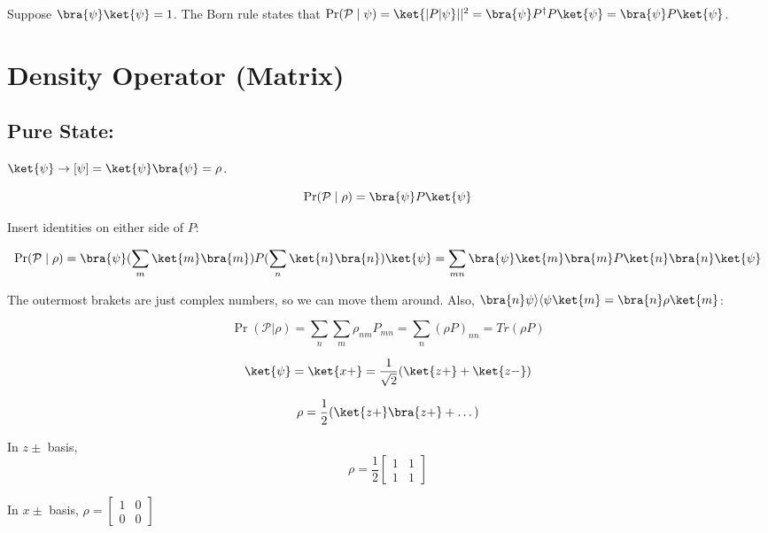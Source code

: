 \documentclass[a4paper,twoside,master.tex]{subfiles}
\begin{document}
Suppose $\bra{\psi}\ket{\psi} = 1$. The Born rule states that
$\Pr(\mathcal{P}\mid\psi) = \ket{|P|\psi}||^2 = \bra{\psi}P^\dagger P\ket{\psi} = \bra{\psi}P\ket{\psi}$.

\section{Density Operator (Matrix)}
\label{sec:density_operator_(matrix)}


\subsection{Pure State:}
\label{sub:pure_state:}

$\ket{\psi}\rightarrow [\psi]=\ket{\psi}\bra{\psi} = \rho$.

\begin{equation}
\Pr(\mathcal{P}\mid\rho) = \bra{\psi}P\ket{\psi}
\end{equation}

Insert identities on either side of $P$:

\begin{equation}
\Pr(\mathcal{P}\mid\rho) = \bra{\psi}(\sum_m\ket{m}\bra{m})P(\sum_n\ket{n}\bra{n})\ket{\psi} = \sum_{mn}\bra{\psi}\ket{m}\bra{m}P\ket{n}\bra{n}\ket{\psi}
\end{equation}

The outermost brakets are just complex numbers, so we can move them
around. Also,
$\bra{ n}\psi\rangle\langle\psi\ket{m} = \bra{ n}\rho\ket{m}$:

\begin{equation}
\Pr(\mathcal{P}|\rho) =\sum_n\sum_m\rho_{nm}P_{mn} = \sum_n(\rho P)_{nn} = Tr(\rho P)
\end{equation}

\begin{ex}
\begin{equation}
\ket{\psi} = \ket{x+} = \frac{1}{\sqrt{2}}(\ket{z+} + \ket{z-})
\end{equation}

\begin{equation}
\rho = \frac{1}{2}(\ket{z+}\bra{ z+} + \dots)
\end{equation}

In $z\pm$ basis,
\begin{equation}
\rho = \frac{1}{2}\begin{bmatrix}1&1\\1&1\end{bmatrix}
\end{equation}

In $x\pm$ basis, $\rho = \begin{bmatrix}1&0\\0&0\end{bmatrix}$
\end{ex}
\end{document}
